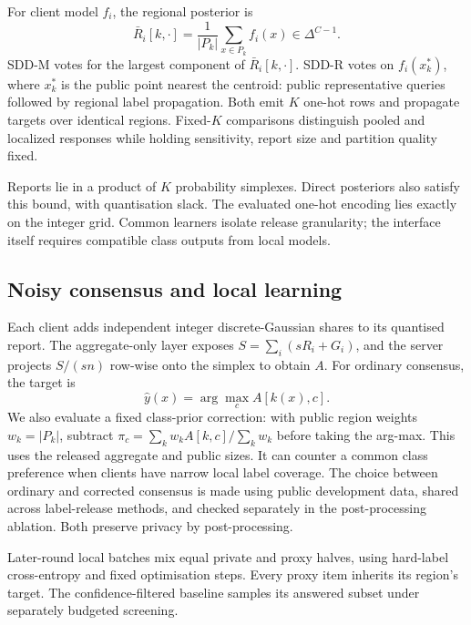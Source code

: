 For client model $f_i$, the regional posterior is
\begin{equation}
\bar R_i[k,\cdot]=\frac1{|P_k|}\sum_{x\in P_k}f_i(x)
\in\Delta^{C-1}.\label{eq:report}
\end{equation}
SDD-M votes for the largest component of $\bar R_i[k,\cdot]$.
SDD-R votes on $f_i(x_k^*)$, where $x_k^*$ is the public point nearest the
centroid: public representative queries followed by regional label propagation.
Both emit $K$ one-hot rows and propagate targets over identical
regions. Fixed-$K$ comparisons distinguish pooled and localized responses
while holding sensitivity, report size and partition quality fixed.

Reports lie in a product of $K$ probability simplexes. Direct posteriors also
satisfy this bound, with quantisation slack. The evaluated one-hot encoding
lies exactly on the integer grid. Common learners isolate release granularity;
the interface itself requires compatible class outputs from local models.

\subsection{Noisy consensus and local learning}
\label{sec:method:agg}

Each client adds independent integer discrete-Gaussian shares to its quantised
report. The aggregate-only layer exposes $S=\sum_i(sR_i+G_i)$, and the server
projects $S/(sn)$ row-wise onto the simplex to obtain $A$.
For ordinary consensus, the target is
\begin{equation}
\hat y(x)=\arg\max_c A[k(x),c].\label{eq:targets}
\end{equation}
We also evaluate a fixed class-prior correction: with public region weights
$w_k=|P_k|$, subtract
$\pi_c=\sum_k w_k A[k,c]/\sum_k w_k$ before taking the arg-max.
This uses the released aggregate and public sizes. It can counter a common
class preference when clients have narrow local label coverage.
The choice between ordinary and corrected consensus is made using public
development data, shared across label-release methods, and checked separately
in the post-processing ablation. Both preserve privacy by post-processing.

Later-round local batches mix equal private and proxy halves, using hard-label
cross-entropy and fixed optimisation steps. Every proxy item inherits its
region's target. The confidence-filtered baseline samples its answered subset
under separately budgeted screening.

